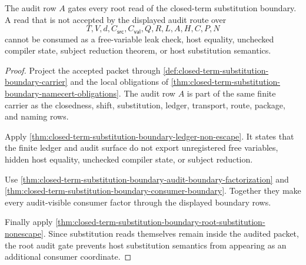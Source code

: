 \begin{theorem}
\label{thm:closed-term-substitution-boundary-root-audit-gate}
The audit row $A$ gates every root read of the closed-term substitution boundary. A read that is not accepted by the displayed audit route over
$$
T,V,d,C_{\mathsf{src}},C_{\mathsf{val}},Q,R,L,A,H,C,P,N
$$
cannot be consumed as a free-variable leak check, host equality, unchecked compiler state, subject reduction theorem, or host substitution semantics.
\end{theorem}
\begin{proof}
Project the accepted packet through \autoref{def:closed-term-substitution-boundary-carrier} and the local obligations of \autoref{thm:closed-term-substitution-boundary-namecert-obligations}. The audit row $A$ is part of the same finite carrier as the closedness, shift, substitution, ledger, transport, route, package, and naming rows.

Apply \autoref{thm:closed-term-substitution-boundary-ledger-non-escape}. It states that the finite ledger and audit surface do not export unregistered free variables, hidden host equality, unchecked compiler state, or subject reduction.

Use \autoref{thm:closed-term-substitution-boundary-audit-boundary-factorization} and \autoref{thm:closed-term-substitution-boundary-consumer-boundary}. Together they make every audit-visible consumer factor through the displayed boundary rows.

Finally apply \autoref{thm:closed-term-substitution-boundary-root-substitution-nonescape}. Since substitution reads themselves remain inside the audited packet, the root audit gate prevents host substitution semantics from appearing as an additional consumer coordinate.
\end{proof}

